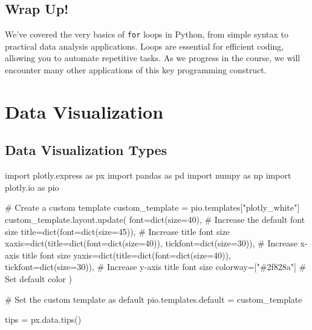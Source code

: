 \documentclass[
  letterpaper,
  DIV=11,
  numbers=noendperiod]{scrreprt}
\newenvironment{Shaded}{\begin{snugshade}}{\end{snugshade}}
\newcommand{\BuiltInTok}[1]{\textcolor[rgb]{0.00,0.23,0.31}{#1}}
\newcommand{\CommentTok}[1]{\textcolor[rgb]{0.37,0.37,0.37}{#1}}
\newcommand{\DecValTok}[1]{\textcolor[rgb]{0.68,0.00,0.00}{#1}}
\newcommand{\ImportTok}[1]{\textcolor[rgb]{0.00,0.46,0.62}{#1}}
\newcommand{\NormalTok}[1]{\textcolor[rgb]{0.00,0.23,0.31}{#1}}
\newcommand{\OperatorTok}[1]{\textcolor[rgb]{0.37,0.37,0.37}{#1}}
\newcommand{\StringTok}[1]{\textcolor[rgb]{0.13,0.47,0.30}{#1}}
\begin{document}
\chapter{Wrap Up!}\label{wrap-up-3}

We've covered the very basics of \texttt{for} loops in Python, from
simple syntax to practical data analysis applications. Loops are
essential for efficient coding, allowing you to automate repetitive
tasks. As we progress in the course, we will encounter many other
applications of this key programming construct.

\part{Data Visualization}

\chapter{Data Visualization Types}\label{data-visualization-types}

\begin{Shaded}
\begin{Highlighting}[]
\ImportTok{import}\NormalTok{ plotly.express }\ImportTok{as}\NormalTok{ px}
\ImportTok{import}\NormalTok{ pandas }\ImportTok{as}\NormalTok{ pd}
\ImportTok{import}\NormalTok{ numpy }\ImportTok{as}\NormalTok{ np}
\ImportTok{import}\NormalTok{ plotly.io }\ImportTok{as}\NormalTok{ pio}

\CommentTok{\# Create a custom template}
\NormalTok{custom\_template }\OperatorTok{=}\NormalTok{ pio.templates[}\StringTok{"plotly\_white"}\NormalTok{]}
\NormalTok{custom\_template.layout.update(}
\NormalTok{    font}\OperatorTok{=}\BuiltInTok{dict}\NormalTok{(size}\OperatorTok{=}\DecValTok{40}\NormalTok{),  }\CommentTok{\# Increase the default font size}
\NormalTok{    title}\OperatorTok{=}\BuiltInTok{dict}\NormalTok{(font}\OperatorTok{=}\BuiltInTok{dict}\NormalTok{(size}\OperatorTok{=}\DecValTok{45}\NormalTok{)),  }\CommentTok{\# Increase title font size}
\NormalTok{    xaxis}\OperatorTok{=}\BuiltInTok{dict}\NormalTok{(title}\OperatorTok{=}\BuiltInTok{dict}\NormalTok{(font}\OperatorTok{=}\BuiltInTok{dict}\NormalTok{(size}\OperatorTok{=}\DecValTok{40}\NormalTok{)), tickfont}\OperatorTok{=}\BuiltInTok{dict}\NormalTok{(size}\OperatorTok{=}\DecValTok{30}\NormalTok{)),  }\CommentTok{\# Increase x{-}axis title font size}
\NormalTok{    yaxis}\OperatorTok{=}\BuiltInTok{dict}\NormalTok{(title}\OperatorTok{=}\BuiltInTok{dict}\NormalTok{(font}\OperatorTok{=}\BuiltInTok{dict}\NormalTok{(size}\OperatorTok{=}\DecValTok{40}\NormalTok{)), tickfont}\OperatorTok{=}\BuiltInTok{dict}\NormalTok{(size}\OperatorTok{=}\DecValTok{30}\NormalTok{)),  }\CommentTok{\# Increase y{-}axis title font size}
\NormalTok{    colorway}\OperatorTok{=}\NormalTok{[}\StringTok{"\#2f828a"}\NormalTok{]  }\CommentTok{\# Set default color}
\NormalTok{)}

\CommentTok{\# Set the custom template as default}
\NormalTok{pio.templates.default }\OperatorTok{=}\NormalTok{ custom\_template}

\NormalTok{tips }\OperatorTok{=}\NormalTok{ px.data.tips()}
\end{Highlighting}
\end{Shaded}
\end{document}
